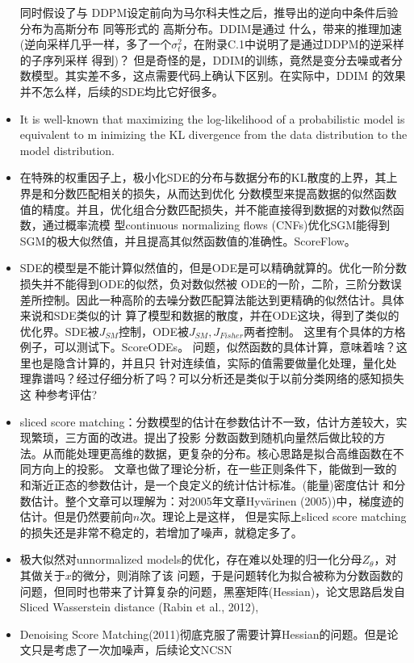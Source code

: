 \documentclass[lang=cn,newtx,10pt,scheme=chinese]{elegantbook}
\begin{document}
\begin{itemize}
  同时假设了与 DDPM设定前向为马尔科夫性之后，推导出的逆向中条件后验分布为高斯分布 同等形式的 高斯分布。DDIM是通过
  什么，带来的推理加速(逆向采样几乎一样，多了一个$\sigma^2_{t}$，在附录C.1中说明了是通过DDPM的逆采样的子序列采样
  得到)？ 但是奇怪的是，DDIM的训练，竟然是变分去噪或者分数模型。其实差不多，这点需要代码上确认下区别。在实际中，DDIM
  的效果并不怎么样，后续的SDE均比它好很多。
  \item It is well-known that maximizing the log-likelihood of a probabilistic model is equivalent to m
  inimizing the KL divergence from the data distribution to the model distribution.
  \item 在特殊的权重因子上，极小化SDE的分布与数据分布的KL散度的上界，其上界是和分数匹配相关的损失，从而达到优化
  分数模型来提高数据的似然函数值的精度。并且，优化组合分数匹配损失，并不能直接得到数据的对数似然函数，通过概率流模
  型continuous normalizing flows (CNFs)优化SGM能得到SGM的极大似然值，并且提高其似然函数值的准确性。ScoreFlow。
  \item SDE的模型是不能计算似然值的，但是ODE是可以精确就算的。优化一阶分数损失并不能得到ODE的似然，负对数似然被
  ODE的一阶，二阶，三阶分数误差所控制。因此一种高阶的去噪分数匹配算法能达到更精确的似然估计。具体来说和SDE类似的计
  算了模型和数据的散度，并在ODE这块，得到了类似的优化界。SDE被$J_{SM}$控制，ODE被$J_{SM}, J_{Fisher}$两者控制。
  这里有个具体的方格例子，可以测试下。ScoreODEs。 问题，似然函数的具体计算，意味着啥？这里也是隐含计算的，并且只
  针对连续值，实际的值需要做量化处理，量化处理靠谱吗？经过仔细分析了吗？可以分析还是类似于以前分类网络的感知损失这
  种参考评估?
  \item sliced  score matching：分数模型的估计在参数估计不一致，估计方差较大，实现繁琐，三方面的改进。提出了投影
  分数函数到随机向量然后做比较的方法。从而能处理更高维的数据，更复杂的分布。核心思路是拟合高维函数在不同方向上的投影。
  文章也做了理论分析，在一些正则条件下，能做到一致的和渐近正态的参数估计，是一个良定义的统计估计标准。(能量)密度估计
  和分数估计。整个文章可以理解为：对2005年文章Hyvärinen (2005))中，梯度迹的估计。但是仍然要前向$n$次。理论上是这样，
  但是实际上sliced  score matching的损失还是非常不稳定的，若增加了噪声，就稳定多了。
  \item 极大似然对unnormalized  models的优化，存在难以处理的归一化分母$Z_\theta$，对其做关于$x$的微分，则消除了该
  问题，于是问题转化为拟合被称为分数函数的问题，但同时也带来了计算复杂的问题，黑塞矩阵(Hessian)，论文思路启发自
  Sliced Wasserstein distance (Rabin et al., 2012),
  \item Denoising Score Matching(2011)彻底克服了需要计算Hessian的问题。但是论文只是考虑了一次加噪声，后续论文NCSN

\end{itemize}
\end{document}
